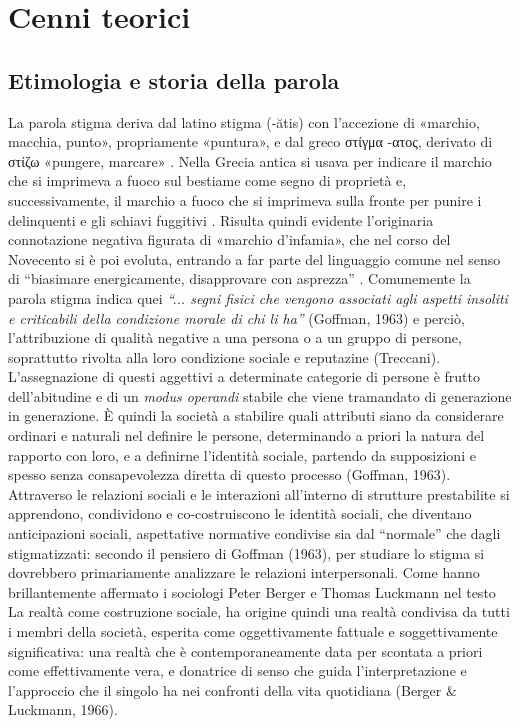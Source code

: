 \chapter{Cenni teorici}

\section{Etimologia e storia della parola}

La parola stigma deriva dal latino stigma (-ătis) con l’accezione di «marchio, macchia, punto», propriamente «puntura», e dal greco \textgreek{στίγμα -ατος}, derivato di \textgreek{στίζω} «pungere, marcare» \autocite{treccani-stigma}.
Nella Grecia antica si usava per indicare il marchio che si imprimeva a fuoco sul bestiame come segno di proprietà e, successivamente, il marchio a fuoco che si imprimeva sulla fronte per punire i delinquenti e gli schiavi fuggitivi \autocite{garzanti-linguistica-stigma}.
Risulta quindi evidente l’originaria connotazione negativa figurata di «marchio d’infamia», che nel corso del Novecento si è poi evoluta, entrando a far parte del linguaggio comune nel senso di “biasimare energicamente, disapprovare con asprezza” \autocite{crusca-stigmatizzare}.
Comunemente la parola stigma indica quei \textit{“... segni fisici che vengono associati agli aspetti insoliti e criticabili della condizione morale di chi li ha”} (Goffman, 1963) e perciò, l’attribuzione di qualità negative a una persona o a un gruppo di persone, soprattutto rivolta alla loro condizione sociale e reputazine (Treccani).
L’assegnazione di questi aggettivi a determinate categorie di persone è frutto dell’abitudine e di un \textit{modus operandi} stabile che viene tramandato di generazione in generazione.
È quindi la società a stabilire quali attributi siano da considerare ordinari e naturali nel definire le persone, determinando a priori la natura del rapporto con loro, e a definirne l’identità sociale, partendo da supposizioni e spesso senza consapevolezza diretta di questo processo (Goffman, 1963).
Attraverso le relazioni sociali e le interazioni all'interno di strutture prestabilite si apprendono, condividono e co-costruiscono le identità sociali, che diventano anticipazioni sociali, aspettative normative condivise sia dal “normale” che dagli stigmatizzati: secondo il pensiero di Goffman (1963), per studiare lo stigma si dovrebbero primariamente analizzare le relazioni interpersonali. Come hanno brillantemente affermato i sociologi Peter Berger e Thomas Luckmann nel testo La realtà come costruzione sociale, ha origine quindi una realtà condivisa da tutti i membri della società, esperita come oggettivamente fattuale e soggettivamente significativa: una realtà che è contemporaneamente data per scontata a priori come effettivamente vera, e donatrice di senso che guida l’interpretazione e l’approccio che il singolo ha nei confronti della vita quotidiana (Berger \& Luckmann, 1966).
